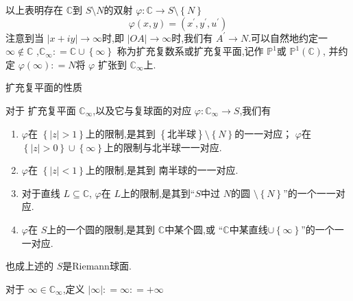 \documentclass[../../复变函数.tex]{subfiles}
\begin{document}
以上表明存在 \(  \mathbb{C}   \)到 \(  S\setminus N  \)的双射 \(   \varphi : \mathbb{C} \to S \setminus \left\{ N \right\}  \) \[
\varphi \left( x,y \right)=  \left( x^{\prime} ,y^{\prime} ,u^{\prime}  \right)  
\]   注意到当 \(  \left| x+ iy \right|\to \infty   \)时,即 \(  \left| OA \right|\to \infty   \)时,我们有 \(  A^{\prime}   \to N\).可以自然地约定一 \(  \infty \not\in \mathbb{C}   \)  ,\(  \mathbb{C} _{\infty}: =  \mathbb{C} \cup \left\{ \infty \right\}  \) 
称为扩充复数系或扩充复平面,记作 \(  \mathbb{P}^{1}  \)或 \(  \mathbb{P}^{1}\left( \mathbb{C}  \right)   \),  并约定 \(   \varphi \left( \infty \right): = N   \)将 \(   \varphi   \)     扩张到 \(  \mathbb{C} _{\infty}  \)上. 

\begin{proposition}{扩充复平面的性质}

    对于 扩充复平面 \(  \mathbb{C} _{\infty}  \),以及它与复球面的对应 \(   \varphi : \mathbb{C} _{\infty}\to S  \),我们有
    
    \begin{enumerate}
        \item   \(   \varphi   \)在 \(  \left\{ \left| z \right|>1  \right\}  \)上的限制,是其到 \(  \left\{ \text{北半球} \right\}\setminus \left\{ N \right\}  \)的一一对应；  \(   \varphi   \)在 \(  \left\{ \left| z \right|>0  \right\}\cup \left\{ \infty \right\}  \)上的限制与北半球一一对应.
        \item \(   \varphi   \)在 \(  \left\{ \left| z \right|<1  \right\}  \)上的限制,是其到 南半球的一一对应.     
        \item 对于直线 \(  L\subseteq \mathbb{C}   \), \(   \varphi   \)在 \(  L  \)上的限制,是其到“\(  S  \)中过 \(  N  \)的圆 \(  \setminus \left\{ N \right\}  \)”的一个一一对应.      
        \item   \(   \varphi   \)在 \(  S  \)上的一个圆的限制,是其到 \(  \mathbb{C}   \)中某个圆,或 “\(  \mathbb{C}   \)中某直线\(  \cup \left\{ \infty \right\}  \)”的一个一一对应.       
    \end{enumerate}
    
    
\end{proposition}


\begin{remark}
    也成上述的 \(  S  \)是Riemann球面.  
\end{remark}

\begin{definition}
    对于 \(  \infty \in \mathbb{C} _{\infty}  \),定义 \(  \left| \infty \right|: =  \infty: =  + \infty   \)  
\end{definition}
\end{document}
